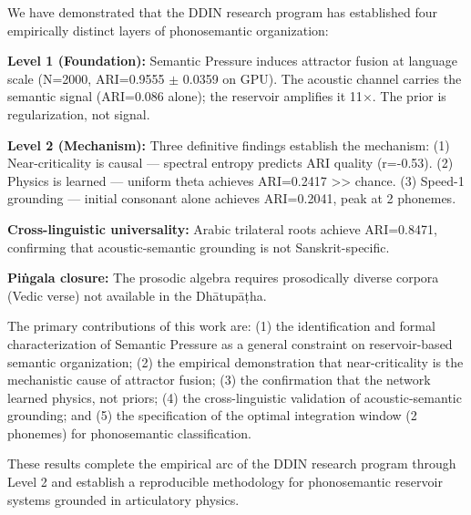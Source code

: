 \documentclass{article}
\begin{document}
We have demonstrated that the DDIN research program has established four
empirically distinct layers of phonosemantic organization:

\textbf{Level 1 (Foundation):} Semantic Pressure induces attractor fusion at
language scale (N=2000, ARI=0.9555 $\pm$ 0.0359 on GPU). The acoustic channel
carries the semantic signal (ARI=0.086 alone); the reservoir amplifies it
11$\times$. The prior is regularization, not signal.

\textbf{Level 2 (Mechanism):} Three definitive findings establish the mechanism:
(1) Near-criticality is causal — spectral entropy predicts ARI quality
(r=-0.53). (2) Physics is learned — uniform theta achieves ARI=0.2417 >> chance.
(3) Speed-1 grounding — initial consonant alone achieves ARI=0.2041, peak at
2 phonemes.

\textbf{Cross-linguistic universality:} Arabic trilateral roots achieve
ARI=0.8471, confirming that acoustic-semantic grounding is not Sanskrit-specific.

\textbf{Piṅgala closure:} The prosodic algebra requires prosodically diverse
corpora (Vedic verse) not available in the Dhātupāṭha.

The primary contributions of this work are: (1) the identification and formal
characterization of Semantic Pressure as a general constraint on reservoir-based
semantic organization; (2) the empirical demonstration that near-criticality
is the mechanistic cause of attractor fusion; (3) the confirmation that the
network learned physics, not priors; (4) the cross-linguistic validation of
acoustic-semantic grounding; and (5) the specification of the optimal integration
window (2 phonemes) for phonosemantic classification.

These results complete the empirical arc of the DDIN research program through
Level 2 and establish a reproducible methodology for phonosemantic reservoir
systems grounded in articulatory physics.



\end{document}
